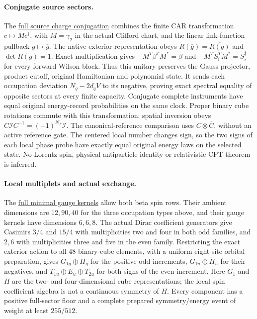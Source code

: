 \paragraph{Conjugate source sectors.}
The \href{https://github.com/FloatingPragma/observer-patch-holography/blob/main/model/particle_primary_charge_conjugation/PROOF.md}{full source charge conjugation}
combines the finite CAR transformation $c\mapsto Mc^\dagger$, with
$M=\gamma_2$ in the actual Clifford chart, and the linear link-function
pullback $g\mapsto\overline g$. The native exterior representation obeys
$R(\overline g)=\overline{R(g)}$ and $\det R(g)=1$. Exact multiplication
gives $-M^T\beta^TM^*=\beta$ and $-M^TS_i^TM^*=S_i^\dagger$ for every
forward Wilson block. Thus this unitary preserves the Gauss projector,
product cutoff, original Hamiltonian and polynomial state. It sends each
occupation deviation $N_q-2d_qV$ to its negative, proving exact spectral
equality of opposite sectors at every finite capacity. Conjugate complete
instruments have equal original energy-record probabilities on the same
clock. Proper binary cube rotations commute with this transformation;
spatial inversion obeys $C\mathcal I C^{-1}=(-1)^{N_F}\mathcal I$.
The canonical-reference comparison uses $C\otimes\overline C$, without
an active reference gate. The centered local number changes sign, so the
two signs of each local phase probe have exactly equal original energy
laws on the selected state. No Lorentz spin, physical antiparticle identity
or relativistic CPT theorem is inferred.

\paragraph{Local multiplets and actual exchange.}
The \href{https://github.com/FloatingPragma/observer-patch-holography/blob/main/model/particle_primary_composite_spin/PROOF.md}{full minimal gauge kernels}
allow both beta spin rows. Their ambient dimensions are $12,90,40$ for
the three occupation types above, and their gauge kernels have dimensions
$6,6,8$. The actual Dirac coefficient generators give Casimirs $3/4$
and $15/4$ with multiplicities two and four in both odd families, and
$2,6$ with multiplicities three and five in the even family. Restricting
the exact exterior action to all 48 binary-cube elements, with a uniform
eight-site orbital preparation, gives $G_{1g}\oplus H_g$ for the positive
odd increments, $G_{1u}\oplus H_u$ for their negatives, and
$T_{1u}\oplus E_u\oplus T_{2u}$ for both signs of the even increment.
Here $G_1$ and $H$ are the two- and four-dimensional cube representations;
the local spin coefficient algebra is not a continuous symmetry of $H$.
Every component has a positive full-sector floor and a complete prepared
symmetry/energy event of weight at least $255/512$.

